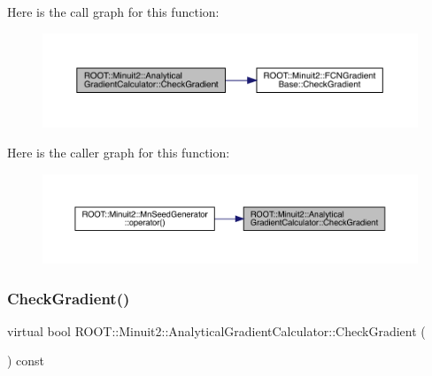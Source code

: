 Here is the call graph for this function\+:\nopagebreak
\begin{figure}[H]
\begin{center}
\leavevmode
\includegraphics[width=350pt]{dd/d3a/classROOT_1_1Minuit2_1_1AnalyticalGradientCalculator_adee37f46da7ed30710a050462c0aa6f0_cgraph}
\end{center}
\end{figure}
Here is the caller graph for this function\+:\nopagebreak
\begin{figure}[H]
\begin{center}
\leavevmode
\includegraphics[width=350pt]{dd/d3a/classROOT_1_1Minuit2_1_1AnalyticalGradientCalculator_adee37f46da7ed30710a050462c0aa6f0_icgraph}
\end{center}
\end{figure}
\mbox{\label{classROOT_1_1Minuit2_1_1AnalyticalGradientCalculator_aad6bcafd96845df588392bb7b255ece8}} 
\subsubsection{\texorpdfstring{CheckGradient()}{CheckGradient()}\hspace{0.1cm}{\footnotesize\ttfamily [2/2]}}
{\footnotesize\ttfamily virtual bool R\+O\+O\+T\+::\+Minuit2\+::\+Analytical\+Gradient\+Calculator\+::\+Check\+Gradient (\begin{DoxyParamCaption}{ }\end{DoxyParamCaption}) const\hspace{0.3cm}{\ttfamily [virtual]}}

